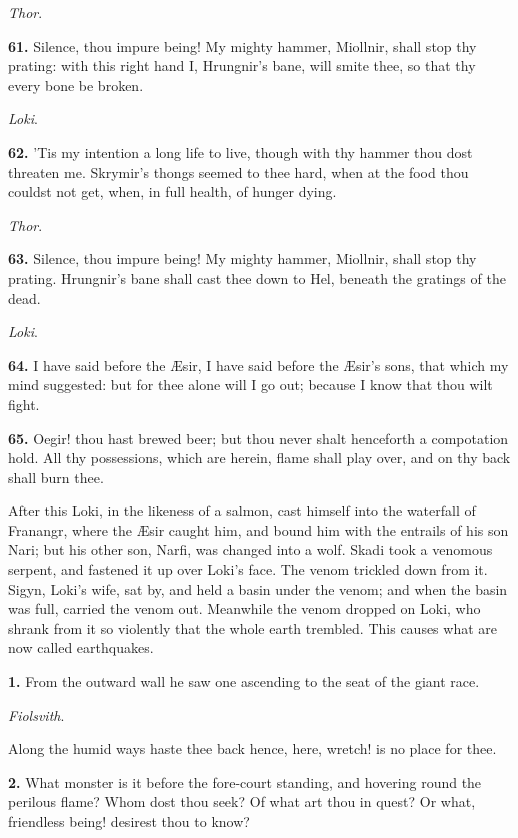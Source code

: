 \emph{Thor}.

\textbf{61.} Silence, thou impure being! My mighty hammer, Miollnir, shall
stop thy prating: with this right hand I, Hrungnir's bane, will smite
thee, so that thy every bone be broken.

\emph{Loki}.

\textbf{62.} 'Tis my intention a long life to live, though with thy hammer
thou dost threaten me. Skrymir's thongs seemed to thee hard, when at
the food thou couldst not get, when, in full health, of hunger dying.

\emph{Thor}.

\textbf{63.} Silence, thou impure being! My mighty hammer, Miollnir, shall
stop thy prating. Hrungnir's bane shall cast thee down to Hel, beneath
the gratings of the dead.

\emph{Loki}.

\textbf{64.} I have said before the Æsir, I have said before the Æsir's sons,
that which my mind suggested: but for thee alone will I go out;
because I know that thou wilt fight.

\textbf{65.} Oegir! thou hast brewed beer; but thou never shalt henceforth a
compotation hold. All thy possessions, which are herein, flame shall
play over, and on thy back shall burn thee.

After this Loki, in the likeness of a salmon, cast himself into the
waterfall of Franangr, where the Æsir caught him, and bound him with
the entrails of his son Nari; but his other son, Narfi, was changed
into a wolf. Skadi took a venomous serpent, and fastened it up over
Loki's face. The venom trickled down from it. Sigyn, Loki's wife, sat
by, and held a basin under the venom; and when the basin was full,
carried the venom out. Meanwhile the venom dropped on Loki, who shrank
from it so violently that the whole earth trembled. This causes what
are now called earthquakes.


\textbf{1.} From the outward wall he saw one ascending to the seat of the
giant race.

\emph{Fiolsvith}.

Along the humid ways haste thee back hence, here, wretch! is no place
for thee.

\textbf{2.} What monster is it before the fore-court standing, and hovering
round the perilous flame? Whom dost thou seek? Of what art thou in
quest? Or what, friendless being! desirest thou to know?

